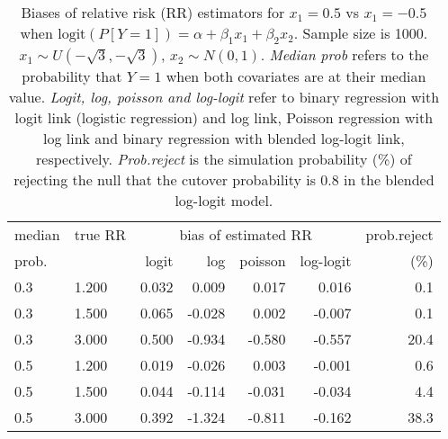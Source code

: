 \documentclass[12pt,a4paper]{article}
\begin{document}
\begin{table}[H] 
\small\sf\centering 
\caption{Biases of relative risk (RR) estimators for $x_1=0.5$ vs $x_1=-0.5$ when $\mbox{logit}(P[Y=1])=\alpha+\beta_1 x_1 + \beta_2 x_2$. Sample size is 1000. $x_1 \sim $$U(-\sqrt{3},-\sqrt{3})$, $x_2 \sim N(0,1)$. {\it Median prob} refers to the probability that $Y=1$ when both covariates are at their median value. {\it Logit, log, poisson and log-logit} refer to binary regression with logit link (logistic regression) and log link, Poisson regression with log link and binary regression with blended log-logit link, respectively. {\it Prob.reject} is the simulation probability (\%) of rejecting the null that the cutover probability is $0.8$ in the blended log-logit model.} 
\begin{tabular}{llrrrrr} 
\toprule 
median & true RR & \multicolumn{4}{c}{bias of estimated RR} & prob.reject \\ 
prob. & & logit & log & poisson & log-logit  & (\%) \\ \midrule 
0.3 & 1.200 & 0.032 &  0.009 &  0.017 &  0.016 &  0.1 \\  
0.3 & 1.500 & 0.065 & -0.028 &  0.002 & -0.007 &  0.1 \\  
0.3 & 3.000 & 0.500 & -0.934 & -0.580 & -0.557 & 20.4 \\  
0.5 & 1.200 & 0.019 & -0.026 &  0.003 & -0.001 &  0.6 \\  
0.5 & 1.500 & 0.044 & -0.114 & -0.031 & -0.034 &  4.4 \\  
0.5 & 3.000 & 0.392 & -1.324 & -0.811 & -0.162 & 38.3 \\  
\bottomrule 
\end{tabular} 
\end{table} 
\end{document}
